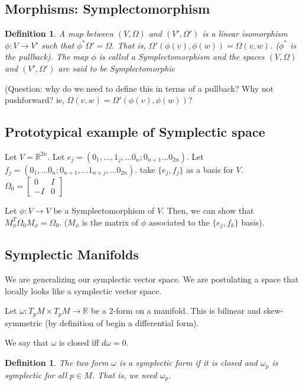 \documentclass[11pt]{book}
\newcommand{\R}{\ensuremath{\mathbb R}}
\newtheorem{definition}[theorem]{Definition}
\begin{document}
\subsection{Morphisms: Symplectomorphism}
\begin{definition}
    A map between $(V, \Omega)$ and $(V', \Omega')$ is a linear isomorphism
    $\phi: V \rightarrow V'$ such that $\phi^* \Omega' = \Omega$. That is,
    $\Omega'(\phi(v), \phi(w)) = \Omega(v, w)$. ($\phi^*$ is the pullback).
    The map $\phi$ is called a Symplectomorphism and the spaces $(V, \Omega)$ and $(V', \Omega')$
    are said to be Symplectomorphic
\end{definition}

(Question: why do we need to define this in terms of a pullback? Why not
pushforward? ie, $\Omega(v, w) = \Omega'(\phi(v), \phi(w))$?

\subsection{Prototypical example of Symplectic space}
Let $V = \R^{2n}$. Let $e_j = (0_1, \dots, 1_j, \dots 0_n; 0_{n+1} \dots 0_{2n})$.
Let $f_j = (0_1, \dots 0_n; 0_{n+1}, \dots 1_{n+j}, \dots 0_{2n})$.
take $\{e_j, f_j\}$  as a basis for $V$.
$\Omega_0 = \begin{bmatrix} 0 & I \\ -I & 0 \end{bmatrix}$

Let $\phi: V \rightarrow V$ be a Symplectomorphism of $V$. Then, we can 
show that $M_\phi^T \Omega_0 M_\phi = \Omega_0$. ($M_\phi$ is the matrix of $\phi$
associated to the $\{e_j, f_k\}$ basis). 

\subsection{Symplectic Manifolds}
We are generalizing our symplectic vector space. We are postulating a space
that locally looks like a symplectic vector space.

Let $\omega: T_p M \times T_p M \rightarrow \mathbb R$ be a 2-form on a manifold.
This is bilinear and skew-symmetric (by definition of begin a differential form).

We say that $\omega$ is closed iff $d\omega = 0$.

\begin{definition}
    The two form $\omega$ is a symplectic form if it is closed and $\omega_p$
    is symplectic for all $p \in M$. That is, we need $\omega_p$.
\end{definition}
\end{document}
